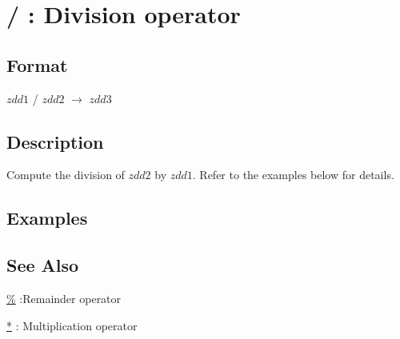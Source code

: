 
\section{/ : Division operator\label{sect:quotiment}}
\subsection*{Format}
$zdd1$ / $zdd2$ $\rightarrow$ $zdd3$

\subsection*{Description}
Compute the division of $zdd2$ by $zdd1$.
Refer to the examples below for details. 

\subsection*{Examples}


\subsection*{See Also}
\hyperref[sect:remainder]{\%} :Remainder operator 

\hyperref[sect:multiply]{*} : Multiplication operator
